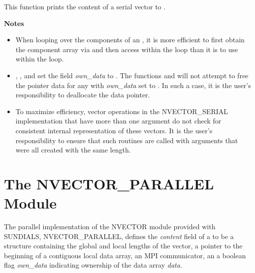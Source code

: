 \documentclass[letterpaper,10pt,english]{sphinxmanual}
\begin{document}
\begin{fulllineitems}
\label{nvectors/NVector_Serial:N_VPrint_Serial}
This function prints the content of a serial vector to .

\end{fulllineitems}


\textbf{Notes}
\begin{itemize}
\item {} 
When looping over the components of an , it is more
efficient to first obtain the component array via  and then access  within the loop than it
is to use  within the loop.

\item {} 
{\hyperref[nvectors/NVector_Serial:N_VNewEmpty_Serial]{}}, {\hyperref[nvectors/NVector_Serial:N_VMake_Serial]{}}, and
{\hyperref[nvectors/NVector_Serial:N_VCloneEmptyVectorArray_Serial]{}} set the field \emph{own\_data}
to .  The functions  and
{\hyperref[nvectors/NVector_Serial:N_VDestroyVectorArray_Serial]{}} will not attempt to free the
pointer data for any  with \emph{own\_data} set to .
In such a case, it is the user's responsibility to deallocate the
data pointer.

\item {} 
To maximize efficiency, vector operations in the NVECTOR\_SERIAL
implementation that have more than one  argument do not
check for consistent internal representation of these vectors. It is
the user's responsibility to ensure that such routines are called
with  arguments that were all created with the same
length.

\end{itemize}


\section{The NVECTOR\_PARALLEL Module}
\label{nvectors/NVector_Parallel:nvectors-nvparallel}\label{nvectors/NVector_Parallel:the-nvector-parallel-module}\label{nvectors/NVector_Parallel::doc}
The parallel implementation of the NVECTOR module provided with
SUNDIALS, NVECTOR\_PARALLEL, defines the \emph{content} field of a
 to be a structure containing the global and local lengths
of the vector, a pointer to the beginning of a contiguous local data
array, an MPI communicator, an a boolean flag \emph{own\_data} indicating
ownership of the data array \emph{data}.
\end{document}
